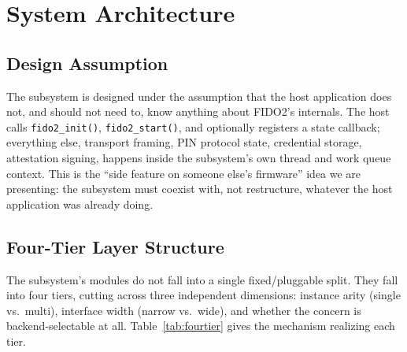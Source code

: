 \section{System Architecture}
\label{sec:architecture}

\subsection{Design Assumption}
\label{subsec:arch-assumption}

The subsystem is designed under the assumption that the host application does not, and should not need to, know anything about FIDO2's internals. The host calls \texttt{fido2\_init()}, \texttt{fido2\_start()}, and optionally registers a state callback; everything else, transport framing, PIN protocol state, credential storage, attestation signing, happens inside the subsystem's own thread and work queue context. This is the ``side feature on someone else's firmware'' idea we are presenting: the subsystem must coexist with, not restructure, whatever the host application was already doing.

\subsection{Four-Tier Layer Structure}
\label{subsec:arch-fourtier}

The subsystem's modules do not fall into a single fixed/pluggable split. They fall into four tiers, cutting across three independent dimensions: instance arity (single vs.\ multi), interface width (narrow vs.\ wide), and whether the concern is backend-selectable at all. Table~\ref{tab:fourtier} gives the mechanism realizing each tier.

